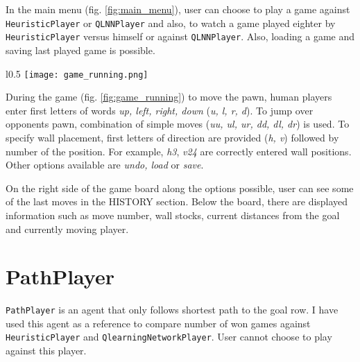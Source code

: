 In the main menu (fig. \ref{fig:main_menu}), user can choose to play a game
against {\lstinline{HeuristicPlayer}} or {\lstinline{QLNNPlayer}} and also,
to watch a game played eighter by {\lstinline{HeuristicPlayer}} versus himself
or against {\lstinline{QLNNPlayer}}. Also, loading a game and saving last
played game is possible.

\begin{wrapfigure}{l}{0.5\textwidth}
  \vspace*{-0.35cm}
  \centering
  \texttt{[image: game\_running.png]}
  \vspace*{-0.30cm}
  \caption{game running}
  \label{fig:game_running}
  \vspace*{-0.60cm}
\end{wrapfigure}

During the game (fig. \ref{fig:game_running}) to move the pawn, human players
enter first letters of words \textit{up, left, right, down}
(\textit{u, l, r, d}). To jump over opponents pawn, combination of simple
moves (\textit{uu, ul, ur, dd, dl, dr}) is used. To specify wall placement,
first letters of direction are provided (\textit{h, v}) followed by number
of the position.  For example, \textit{h3}, \textit{v24} are correctly entered
wall positions. Other options available are \textit{undo, load} or
\textit{save}.

On the right side of the game board along the options possible, user can see
some of the last moves in the HISTORY section. Below the board, there are
displayed information such as move number, wall stocks, current distances from
the goal and currently moving player.

\section{PathPlayer}
{\lstinline{PathPlayer}} is an agent that only follows shortest path to the
goal row. I have used this agent as a reference to compare number of won games
against {\lstinline{HeuristicPlayer}} and {\lstinline{QlearningNetworkPlayer}}.
User cannot choose to play against this player.

